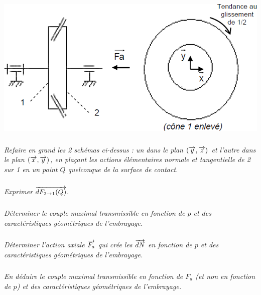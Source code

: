 \documentclass[10pt,fleqn]{article} %
\begin{document}
\begin{multicols}{2}
\begin{multicols}{2}
\begin{center}
\includegraphics[width=.9\linewidth]{images/fig_09}
\end{center}




\subparagraph{}
\textit{Refaire en grand les 2 schémas ci-dessus : un dans le plan $(\overrightarrow{y}, \overrightarrow{z})$ et l’autre dans le plan $(\overrightarrow{x}, \overrightarrow{y})$, en plaçant les actions élémentaires normale et tangentielle de 2 sur 1 en un point $Q$ quelconque de la surface de contact.}

\subparagraph{}
\textit{Exprimer $\overrightarrow{dF_{2\rightarrow 1}(Q)}$.}

\subparagraph{}
\textit{Déterminer le couple maximal transmissible en fonction de $p$ et des caractéristiques 
géométriques de l’embrayage.}

\subparagraph{}
\textit{Déterminer l’action axiale $\overrightarrow{F_a}$ qui crée les $\overrightarrow{dN}$ en fonction de $p$ et des caractéristiques géométriques de l’embrayage.}

\subparagraph{}
\textit{En déduire le couple maximal transmissible en fonction de $F_a$ (et non en fonction de $p$) et des caractéristiques géométriques de l’embrayage.}




\ifprof
\end{multicols}
\else
\end{multicols}
\fi
\end{document}
